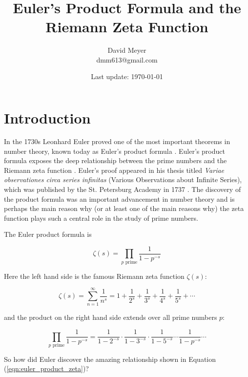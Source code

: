 \documentclass[11pt, oneside]{article}   	%
\title{Euler's Product Formula and the Riemann Zeta Function}
\author{David Meyer \\ dmm613@gmail.com}
\date{Last update: \today}							%
\begin{document}
\maketitle

\section{Introduction}
In the 1730s Leonhard Euler proved one of the most important
theorems in number theory, known today as Euler's product formula
\cite{euler_product_formula}.  Euler's product formula exposes
the deep relationship between the prime numbers and the Riemann
zeta function \cite{wiki:zeta}. Euler's proof appeared in his
thesis titled \emph{Variae observationes circa series infinitas}
(Various Observations about Infinite Series), which was published
by the St. Petersburg Academy in 1737
\cite{mactutor:history_of_calculus}. The discovery of the product
formula was an important advancement in number theory and is
perhaps the main reason why (or at least one of the main reasons
why) the zeta function plays such a central role in the study of
prime numbers.

\medskip
\noindent
The Euler product formula is

\bigskip
\begin{equation}
\zeta (s) = \prod _{p{\text{ prime}}}{\frac {1}{1-p^{-s}}}
\label{eqn:euler_product_zeta}
\end{equation}

\bigskip
\noindent
Here the left hand side is the famous Riemann zeta function 
$\zeta (s)$: 

\bigskip
\begin{equation*}
\zeta (s) = \sum _{n=1}^{\infty } \frac {1}{n^{s}}
          = 1 + \frac {1}{2^{s}} + \frac {1}{3^{s}} + \frac
          {1}{4^{s}}  + \frac {1}{5^{s}}  + \cdots  
\end{equation*}

\bigskip
\noindent
and the product on the right hand side extends over all prime
numbers $p$: 

\bigskip
\begin{equation*}
\prod _{p {\text{ prime}}}  \frac {1}{1-p^{-s}} = \frac
{1}{1-2^{-s}} \cdot \frac {1}{1-3^{-s}} \cdot \frac {1}{1-5^{-s}}
\cdots  \frac {1}{1-p^{-s}} \cdots  
\end{equation*}


\bigskip
\noindent
So how did Euler discover the amazing relationship 
shown in Equation (\ref{eqn:euler_product_zeta})?
\end{document}
